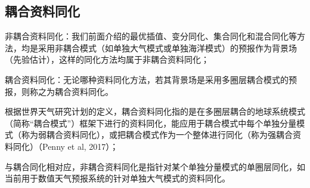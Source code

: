 \documentclass{article}
\begin{document}
\subsection{耦合资料同化}
非耦合资料同化：我们前面介绍的最优插值、变分同化、集合同化和混合同化等方法，均是采用非耦合模式（如单独大气模式或单独海洋模式）的预报作为背景场（先验估计），这样的同化方法均属于非耦合资料同化；

耦合资料同化：无论哪种资料同化方法，若其背景场是采用多圈层耦合模式的预报，则称之为耦合资料同化。

根据世界天气研究计划的定义，耦合资料同化指的是在多圈层耦合的地球系统模式（简称“耦合模式”）框架下进行的资料同化，能应用于耦合模式中每个单独分量模式（称为弱耦合资料同化），或把耦合模式作为一个整体进行同化（称为强耦合资料同化）（Penny et al, 2017）；

与耦合同化相对应，非耦合资料同化是指针对某个单独分量模式的单圈层同化，如当前用于数值天气预报系统的针对单独大气模式的资料同化。
\end{document}
